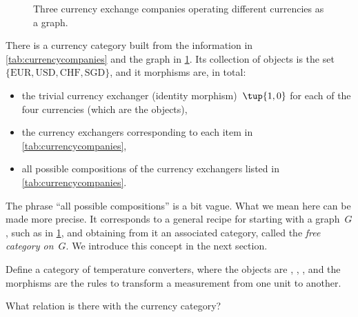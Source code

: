 \begin{figure}[h]
\begin{center}
\end{center}
\caption{Three currency exchange companies operating different currencies as a graph. \label{fig:currencygraph}}
\end{figure}

There is a currency category built from the information in \cref{tab:currencycompanies} and the graph in \cref{fig:currencygraph}. Its collection of objects is the set $\{  \text{EUR}, \text{USD}, \text{CHF}, \text{SGD} \}$, and it morphisms are, in total: 
\begin{itemize}
\item the trivial currency exchanger (identity morphism)~$\tup{1,0}$ for each of the four currencies (which are the objects),
\item the currency exchangers corresponding to each item in \cref{tab:currencycompanies},
\item all possible compositions of the currency exchangers listed in \cref{tab:currencycompanies}.
\end{itemize}

The phrase ``all possible compositions'' is a bit vague. What we mean here can be made more precise. It corresponds to a general recipe for starting with a graph~$G$, such as in \cref{fig:currencygraph}, and obtaining from it an associated category, called the \emph{free category on}~$G$. We introduce this concept in the next section. 


\begin{exercise}[Temperatures]
Define a category of temperature converters, where the objects are 
, , , and the 
morphisms are the rules to transform a measurement from one unit to another.

What relation is there with the currency category?

\end{exercise}


